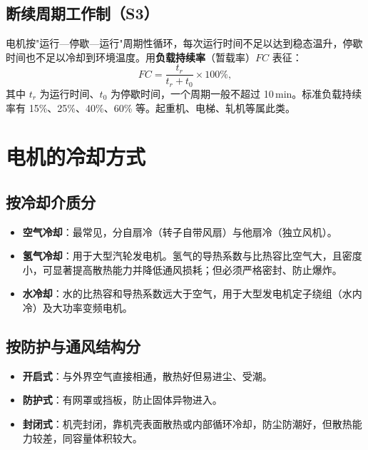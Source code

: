 \subsection{断续周期工作制（S3）}
电机按"运行—停歇—运行"周期性循环，每次运行时间不足以达到稳态温升，停歇时间也不足以冷却到环境温度。用\textbf{负载持续率}（暂载率）$FC$ 表征：
\begin{equation}
FC=\frac{t_r}{t_r+t_0}\times100\%,
\end{equation}
其中 $t_r$ 为运行时间、$t_0$ 为停歇时间，一个周期一般不超过 10\,min。标准负载持续率有 15\%、25\%、40\%、60\% 等。起重机、电梯、轧机等属此类。


\section{电机的冷却方式}

\subsection{按冷却介质分}
\begin{itemize}
  \item \textbf{空气冷却}：最常见，分自扇冷（转子自带风扇）与他扇冷（独立风机）。
  \item \textbf{氢气冷却}：用于大型汽轮发电机。氢气的导热系数与比热容比空气大，且密度小，可显著提高散热能力并降低通风损耗；但必须严格密封、防止爆炸。
  \item \textbf{水冷却}：水的比热容和导热系数远大于空气，用于大型发电机定子绕组（水内冷）及大功率变频电机。
\end{itemize}

\subsection{按防护与通风结构分}
\begin{itemize}
  \item \textbf{开启式}：与外界空气直接相通，散热好但易进尘、受潮。
  \item \textbf{防护式}：有网罩或挡板，防止固体异物进入。
  \item \textbf{封闭式}：机壳封闭，靠机壳表面散热或内部循环冷却，防尘防潮好，但散热能力较差，同容量体积较大。
\end{itemize}

